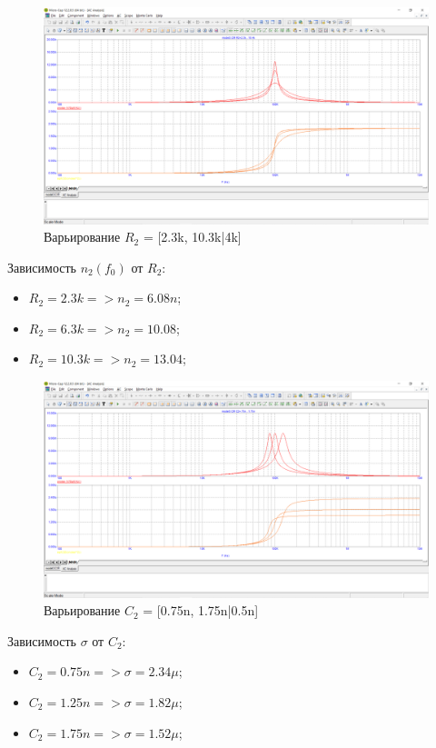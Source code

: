 \documentclass[a4paper, 12pt]{article}%
\begin{document}
\begin{figure}[h!]
    \centering
    \includegraphics[scale = 0.4 \textwidth]{images/mod3_2_3.png}
    \caption{Варьирование $R_2$ = [2.3k, 10.3k|4k]}
    \label{fig:m323}
\end{figure}

Зависимость $n_2(f_0)$ от $R_2$:
\begin{itemize}
    \item $R_2 = 2.3k => n_2 = 6.08n$;
    \item $R_2 = 6.3k => n_2 = 10.08$;
    \item $R_2 = 10.3k => n_2 = 13.04$;
\end{itemize}

\begin{figure}[h!]
    \centering
    \includegraphics[scale = 0.4 \textwidth]{images/mod3_2_4.png}
    \caption{Варьирование $C_2$ = [0.75n, 1.75n|0.5n]}
    \label{fig:m324}
\end{figure}

Зависимость $\sigma$ от $C_2$:
\begin{itemize}
    \item $C_2 = 0.75n => \sigma = 2.34\mu$;
    \item $C_2 = 1.25n => \sigma = 1.82\mu$;
    \item $C_2 = 1.75n => \sigma = 1.52\mu$;
\end{itemize}
\end{document}
